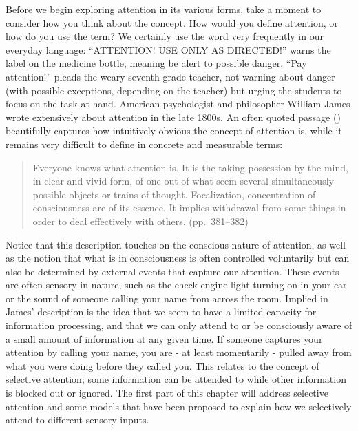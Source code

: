\documentclass[
]{krantz}
\begin{document}
Before we begin exploring attention in its various forms, take a moment to consider how you think about the concept. How would you define attention, or how do you use the term? We certainly use the word very frequently in our everyday language: ``ATTENTION! USE ONLY AS DIRECTED!'' warns the label on the medicine bottle, meaning be alert to possible danger. ``Pay attention!'' pleads the weary seventh-grade teacher, not warning about danger (with possible exceptions, depending on the teacher) but urging the students to focus on the task at hand. American psychologist and philosopher William James wrote extensively about attention in the late 1800s. An often quoted passage () beautifully captures how intuitively obvious the concept of attention is, while it remains very difficult to define in concrete and measurable terms:

\begin{quote}
Everyone knows what attention is. It is the taking possession by the mind, in clear and vivid form, of one out of what seem several simultaneously possible objects or trains of thought. Focalization, concentration of consciousness are of its essence. It implies withdrawal from some things in order to deal effectively with others. (pp.~381--382)
\end{quote}

Notice that this description touches on the conscious nature of attention, as well as the notion that what is in consciousness is often controlled voluntarily but can also be determined by external events that capture our attention. These events are often sensory in nature, such as the check engine light turning on in your car or the sound of someone calling your name from across the room. Implied in James' description is the idea that we seem to have a limited capacity for information processing, and that we can only attend to or be consciously aware of a small amount of information at any given time. If someone captures your attention by calling your name, you are - at least momentarily - pulled away from what you were doing before they called you. This relates to the concept of selective attention; some information can be attended to while other information is blocked out or ignored. The first part of this chapter will address selective attention and some models that have been proposed to explain how we selectively attend to different sensory inputs.
\end{document}

